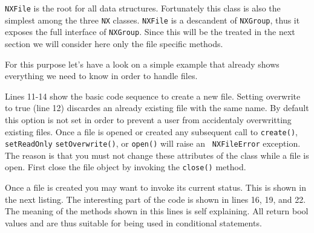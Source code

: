 {\tt NXFile} is the root for all data structures. 
Fortunately this class is also the simplest among the three {\tt NX} classes.
{\tt NXFile} is a descandent of {\tt NXGroup}, thus it exposes the full 
interface of {\tt NXGroup}. Since this will be the treated in the next 
section we will consider here only the file specific methods. 

For this purpose let's have a look on a simple example that already shows
everything we need to know in order to handle files. 

Lines 11-14 show the basic code sequence to create a new file. Setting 
overwrite to true (line 12) discardes an already existing file with the
same name. By default this option is not set in order to prevent a user 
from accidentaly overwritting existing files.
Once a file is opened or created any subsequent call to {\tt create()}, {\tt
setReadOnly} {\tt setOverwrite()}, or {\tt open()} will raise an  {\tt
NXFileError} exception.
The reason is that you must not change these attributes of the class 
while a file is open. First close the file object by invoking the 
{\tt close()} method. 

Once a file is created you may want to invoke its current status. 
This is shown in the next listing.
The interesting part of the code is shown in lines 16, 19, and 22.
The meaning of the methods shown in this lines is self explaining. 
All return bool values and are thus suitable for being used in 
conditional statements. 

